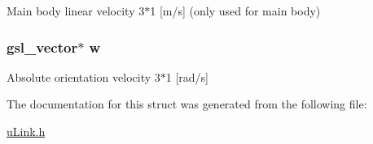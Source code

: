 Main body linear velocity 3$\ast$1 \mbox{[}m/s\mbox{]} (only used for main body) \hypertarget{struct_stu_l_i_n_k_a03f025ccf39e422abad70f0dcc51ea08}{
\subsubsection[{w}]{\setlength{\rightskip}{0pt plus 5cm}gsl\-\_\-vector$\ast$ w}}\label{struct_stu_l_i_n_k_a03f025ccf39e422abad70f0dcc51ea08}
Absolute orientation velocity 3$\ast$1 \mbox{[}rad/s\mbox{]} 

The documentation for this struct was generated from the following file\-:\begin{DoxyCompactItemize}
\item 
\hyperlink{u_link_8h}{u\-Link.\-h}\end{DoxyCompactItemize}
